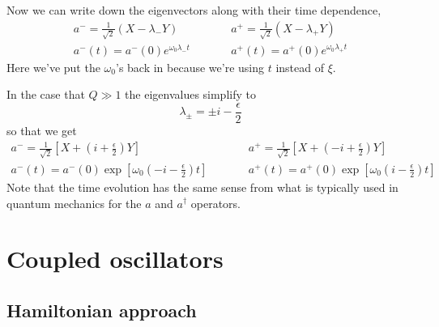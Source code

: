\documentclass{article}
\begin{document}
Now we can write down the eigenvectors along with their time dependence, \begin{eqnarray}
a^- = \frac{1}{\sqrt{2}}\left( X -\lambda_- Y \right) &\qquad&
a^+ = \frac{1}{\sqrt{2}}\left( X -\lambda_+ Y \right) \\
a^-(t) = a^-(0) e^{\omega_0 \lambda_- t} &\qquad& a^+(t) = a^+(0) e^{\omega_0 \lambda_+ t} \end{eqnarray}
Here we've put the $\omega_0$'s back in because we're using $t$ instead of $\xi$.

In the case that $Q \gg 1$ the eigenvalues simplify to \begin{equation}
\lambda_{\pm} = \pm i -\frac{\epsilon}{2} \end{equation}
so that we get \begin{eqnarray}
a^- = \frac{1}{\sqrt{2}}\left[ X + \left( i + \frac{\epsilon}{2} \right) Y \right] &\qquad&
a^+ = \frac{1}{\sqrt{2}}\left[ X + \left(-i + \frac{\epsilon}{2} \right) Y \right] \\
a^-(t) = a^-(0) \exp \left[ \omega_0 \left(-i - \frac{\epsilon}{2}\right) t \right]
& \qquad &
a^+(t) = a^+(0) \exp \left[ \omega_0 \left( i - \frac{\epsilon}{2}\right) t \right] \end{eqnarray}
Note that the time evolution has the same sense from what is typically used in quantum mechanics for the $a$ and $a^{\dagger}$ operators.

\section{Coupled oscillators}



\subsection{Hamiltonian approach}


\end{document}
